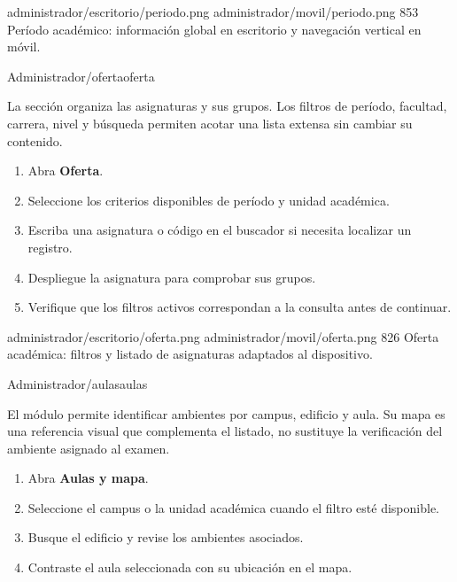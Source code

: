 \documentclass[11pt,a4paper]{article}
\begin{document}

\Pantallas
{administrador/escritorio/periodo.png}
{administrador/movil/periodo.png}
{853}
{Período académico: información global en escritorio
y navegación vertical en móvil.}


{Administrador}{/oferta}{oferta}

La sección organiza las asignaturas y sus grupos.
Los filtros de período, facultad, carrera, nivel y búsqueda
permiten acotar una lista extensa sin cambiar su contenido.

\pasos
\begin{enumerate}
\item Abra \textbf{Oferta}.
\item Seleccione los criterios disponibles de período
y unidad académica.
\item Escriba una asignatura o código en el buscador
si necesita localizar un registro.
\item Despliegue la asignatura para comprobar sus grupos.
\item Verifique que los filtros activos correspondan
a la consulta antes de continuar.
\end{enumerate}


\Pantallas
{administrador/escritorio/oferta.png}
{administrador/movil/oferta.png}
{826}
{Oferta académica: filtros y listado de asignaturas
adaptados al dispositivo.}


{Administrador}{/aulas}{aulas}

El módulo permite identificar ambientes por campus,
edificio y aula. Su mapa es una referencia visual que
complementa el listado, no sustituye la verificación
del ambiente asignado al examen.

\pasos
\begin{enumerate}
\item Abra \textbf{Aulas y mapa}.
\item Seleccione el campus o la unidad académica cuando
el filtro esté disponible.
\item Busque el edificio y revise los ambientes asociados.
\item Contraste el aula seleccionada con su ubicación
en el mapa.
\end{enumerate}
\end{document}
